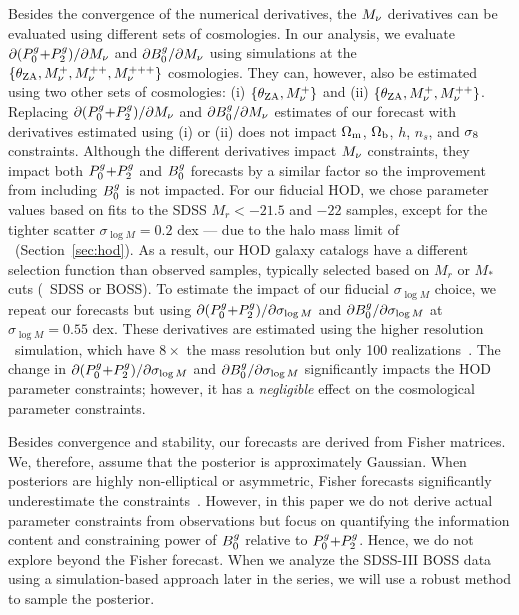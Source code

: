 Besides the convergence of the numerical derivatives, the $M_\nu$ derivatives
can be evaluated using different sets of cosmologies. In our analysis, we
evaluate ${\partial (P^g_0{+}P^g_2)}/{\partial M_\nu}$ and ${\partial B^g_0}/{\partial
M_\nu}$ using simulations at the $\{\theta_{\rm ZA}, M_\nu^+, M_\nu^{++},
M_\nu^{+++}\}$ cosmologies. They can, however, also be estimated using 
two other sets of cosmologies: (i) $\{\theta_{\rm ZA}, M_\nu^+\}$ and (ii)
$\{\theta_{\rm ZA}, M_\nu^+, M_\nu^{++}\}$. Replacing ${\partial
(P^g_0{+}P^g_2)}/{\partial M_\nu}$ and ${\partial B^g_0}/{\partial M_\nu}$ estimates of our
forecast with derivatives estimated using (i) or (ii) does not impact 
$\Omega_{\rm m}$, $\Omega_{\rm b}$, $h$, $n_s$, and $\sigma_8$ constraints. Although the different
derivatives impact $M_\nu$ constraints, they impact both $P^g_0{+}P^g_2$ and $B^g_0$
forecasts by a similar factor so the improvement from including $B^g_0$
is not impacted.
For our fiducial HOD, we chose parameter values based on \cite{zheng2007} 
fits to the SDSS $M_r < -21.5$  and $-22$ samples, except for the tighter
scatter $\sigma_{\log M} = 0.2$ dex --- due to the halo mass limit of 
\quij~(Section~\ref{sec:hod}). As a result, our HOD galaxy 
catalogs have a different selection function than observed samples, typically
selected based on $M_r$ or $M_*$ cuts (\eg~SDSS or BOSS). To estimate the impact
of our fiducial $\sigma_{\log M}$ choice, we repeat our forecasts but using 
${\partial (P^g_0{+}P^g_2)}/{\partial \sigma_{\log M}}$ and ${\partial B^g_0}/{\partial \sigma_{\log M}}$
at $\sigma_{\log M} = 0.55$ dex. These derivatives are estimated using the
higher resolution \quij~simulation, which have $8\times$ the mass resolution 
but only 100 realizations~\citep{villaescusa-navarro2020a}. The change in 
${\partial (P^g_0{+}P^g_2)}/{\partial \sigma_{\log M}}$ and ${\partial
B^g_0}/{\partial \sigma_{\log M}}$ significantly impacts the HOD parameter
constraints; however, it has a {\em negligible} effect on the cosmological
parameter constraints. 

Besides convergence and stability, our forecasts are derived from Fisher
matrices. We, therefore, assume that the posterior is approximately Gaussian. 
When posteriors are highly non-elliptical or asymmetric, Fisher forecasts 
significantly underestimate the constraints~\citep{wolz2012}. However, in
this paper we do not derive actual parameter constraints from observations
but focus on quantifying the information content and constraining power of 
$B^g_0$ relative to
$P^g_0{+}P^g_2$. Hence, we do not explore beyond the Fisher forecast. When we analyze
the SDSS-III BOSS data using a simulation-based approach later in the series,
we will use a robust method to sample the posterior. 

